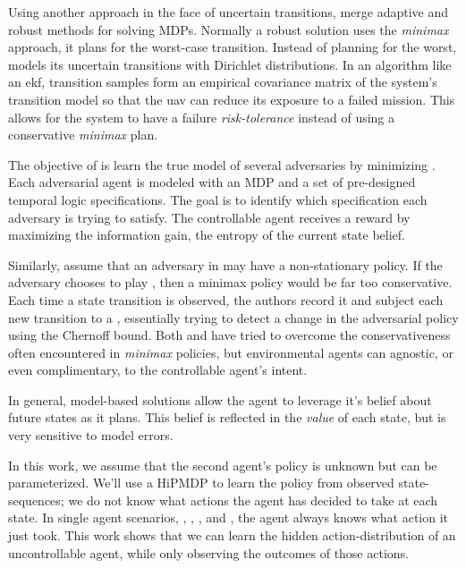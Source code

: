     Using another approach in the face of uncertain transitions, \cite{bertuccelli2012robust} merge adaptive and robust
    methods for solving \acp{MDP}. Normally a robust solution uses the \textit{minimax} approach, it plans for the
    worst-case transition. Instead of planning for the worst,  models its uncertain transitions with Dirichlet
    distributions. In an algorithm like an \ac{ekf}, transition samples form an empirical covariance matrix of the
    system's transition model so that the \ac{uav} can reduce its exposure to a failed mission. This allows for the
    system to have a failure \emph{risk-tolerance} instead of using a conservative \emph{minimax} plan.

    The objective of \cite{chinchali2017multi} is learn the true model of several adversaries by minimizing
    . Each adversarial agent is modeled with an \ac{MDP} and a set of
    pre-designed temporal logic specifications. The goal is to identify which specification each adversary is trying to
    satisfy. The controllable agent receives a reward by maximizing the information gain, the entropy of the current
    state belief.

    Similarly, \cite{lim2013reinforcement} assume that an adversary in  may have a non-stationary policy. If
    the adversary chooses to play , then a minimax policy would be far too conservative. Each
    time a state transition is observed, the authors record it and subject each new transition to a
    , essentially trying to detect a change in the adversarial policy using the
    Chernoff bound. Both \cite{lim2013reinforcement} and \cite{bertuccelli2012robust} have tried to overcome the
    conservativeness often encountered in \textit{minimax} policies, but environmental agents can agnostic, or even
    complimentary, to the controllable agent's intent.

    In general, model-based solutions allow the agent to leverage it's belief about future states as it plans. This
    belief is reflected in the \textit{value} of each state, but is very sensitive to model errors.

    In this work, we assume that the second agent's policy is unknown but can be parameterized. We'll use a \ac{HiPMDP}
    to learn the policy from observed state-sequences; we do not know what actions the agent has decided to take at each
    state. In single agent scenarios, \cite{Fu-RSS-14}, \cite{bertuccelli2012robust}, \cite{peters2008reinforcement},
    and \cite{tangkaratt2014model}, the agent always knows what action it just took. This work shows that we can learn
    the hidden action-distribution of an uncontrollable agent, while only observing the outcomes of those actions.

